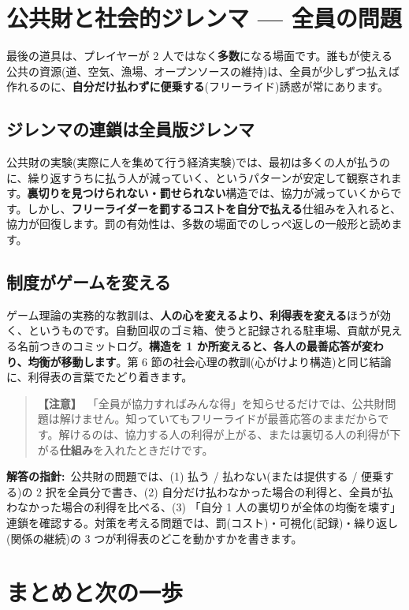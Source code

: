 \documentclass{article}
\begin{document}
\section{公共財と社会的ジレンマ — 全員の問題}

最後の道具は、プレイヤーが 2 人ではなく\textbf{多数}になる場面です。誰もが使える公共の資源(道、空気、漁場、オープンソースの維持)は、全員が少しずつ払えば作れるのに、\textbf{自分だけ払わずに便乗する}(フリーライド)誘惑が常にあります。

\subsection{ジレンマの連鎖は全員版ジレンマ}

公共財の実験(実際に人を集めて行う経済実験)では、最初は多くの人が払うのに、繰り返すうちに払う人が減っていく、というパターンが安定して観察されます。\textbf{裏切りを見つけられない・罰せられない}構造では、協力が減っていくからです。しかし、\textbf{フリーライダーを罰するコストを自分で払える}仕組みを入れると、協力が回復します。罰の有効性は、多数の場面でのしっぺ返しの一般形と読めます。

\subsection{制度がゲームを変える}

ゲーム理論の実務的な教訓は、\textbf{人の心を変えるより、利得表を変える}ほうが効く、というものです。自動回収のゴミ箱、使うと記録される駐車場、貢献が見える名前つきのコミットログ。\textbf{構造を 1 か所変えると、各人の最善応答が変わり、均衡が移動します}。第 6 節の社会心理の教訓(心がけより構造)と同じ結論に、利得表の言葉でたどり着きます。

\begin{quote}
\textbf{【注意】}\ 「全員が協力すればみんな得」を知らせるだけでは、公共財問題は解けません。知っていてもフリーライドが最善応答のままだからです。解けるのは、協力する人の利得が上がる、または裏切る人の利得が下がる\textbf{仕組み}を入れたときだけです。
\end{quote}

\textbf{解答の指針:}\ 公共財の問題では、(1) 払う / 払わない(または提供する / 便乗する)の 2 択を全員分で書き、(2) 自分だけ払わなかった場合の利得と、全員が払わなかった場合の利得を比べる、(3) 「自分 1 人の裏切りが全体の均衡を壊す」連鎖を確認する。対策を考える問題では、罰(コスト)・可視化(記録)・繰り返し(関係の継続)の 3 つが利得表のどこを動かすかを書きます。

\section{まとめと次の一歩}
\end{document}
